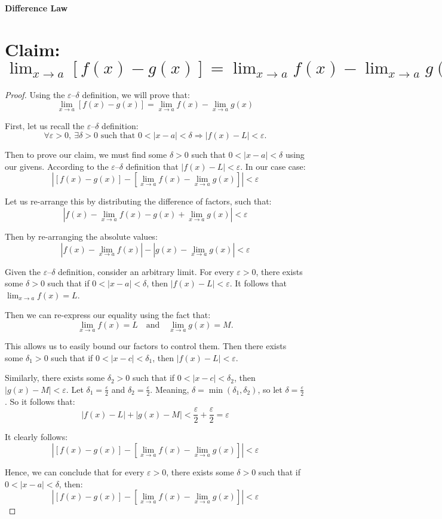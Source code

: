 \documentclass{article}
\begin{document}
\textbf{Difference Law}

\section*{Claim: $\lim_{x \to a} [f(x) - g(x)] = \lim_{x \to a} f(x) - \lim_{x \to a} g(x)$}

	
\begin{proof}


Using the $\varepsilon$–$\delta$ definition, we will prove that: 
\[
\lim_{x \to a} [f(x) - g(x)] = \lim_{x \to a} f(x) - \lim_{x \to a} g(x)
\]


First, let us recall the $\varepsilon$–$\delta$ definition:
\[
\forall \varepsilon > 0, \ \exists \delta > 0 \text{ such that } 0 < |x - a| < \delta \Rightarrow \left|f(x) - L\right| < \varepsilon.
\]


Then to prove our claim, we must find some $\delta > 0$ such that $0 < |x - a| < \delta$ using our givens. According to the $\varepsilon$–$\delta$ definition that $\left|f(x) - L\right| < \varepsilon$. In our case case: 
\[
\left| [f(x) - g(x)] - \left[\lim_{x \to a} f(x) - \lim_{x \to a} g(x) \right] \right| < \varepsilon
\]


Let us re-arrange this by distributing the difference of factors, such that:
\[
\left| f(x) - \lim_{x \to a} f(x) - g(x) + \lim_{x \to a} g(x) \right| < \varepsilon
\]


Then by re-arranging the absolute values:
\[
\left| f(x) - \lim_{x \to a} f(x) \right| - \left| g(x) - \lim_{x \to a} g(x) \right| < \varepsilon
\]


Given the $\varepsilon$--$\delta$ definition, consider an arbitrary limit. For every $\varepsilon > 0$, there exists some $\delta > 0$ such that if $0 < |x - a| < \delta$, then $|f(x) - L| < \varepsilon$. It follows that $\lim_{x \to a} f(x) = L$.


Then we can re-express our equality using the fact that:
\[
\lim_{x \to a} f(x) = L \quad \text{and} \quad \lim_{x \to a} g(x) = M.
\]


This allows us to easily bound our factors to control them. Then there exists some $\delta_1 > 0$ such that if $0 < |x - c| < \delta_1$, then $|f(x) - L| < \varepsilon$.  


Similarly, there exists some $\delta_2 > 0$ such that if $0 < |x - c| < \delta_2$, then $|g(x) - M| < \varepsilon$. Let $\delta_1 = \frac{\varepsilon}{2}$ and $\delta_2 = \frac{\varepsilon}{2}$. Meaning, $\delta = \min(\delta_1, \delta_2)$, so let $\delta = \frac{\varepsilon}{2}$. So it follows that:
\[
|f(x) - L| + |g(x) - M| < \frac{\varepsilon}{2} + \frac{\varepsilon}{2} = \varepsilon
\]


It clearly follows:
\[
\left| [f(x) - g(x)] - \left[\lim_{x \to a} f(x) - \lim_{x \to a} g(x) \right] \right| < \varepsilon
\]


Hence, we can conclude that for every $\varepsilon > 0$, there exists some $\delta > 0$ such that if $0 < |x - a| < \delta$, then: 
\[
\left| [f(x) - g(x)] - \left[\lim_{x \to a} f(x) - \lim_{x \to a} g(x) \right] \right| < \varepsilon
\]


\end{proof}
\end{document}
